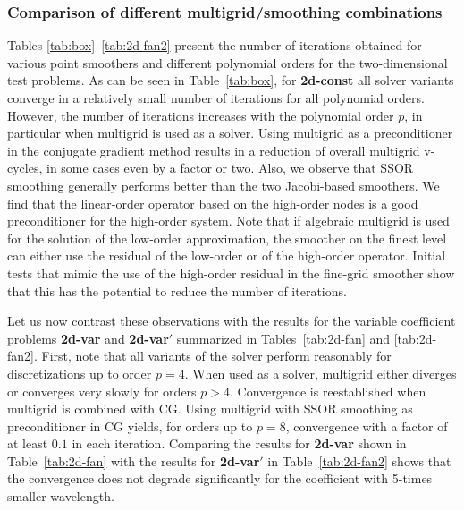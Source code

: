 \documentclass[times]{nlaauth}
\begin{document}
\subsubsection{Comparison of different multigrid/smoothing combinations}\label{subsec:num_point}
Tables \ref{tab:box}--\ref{tab:2d-fan2} present the number of
iterations obtained for various point smoothers and different
polynomial orders for the two-dimensional test problems. As can be
seen in Table~\ref{tab:box}, for {\bf 2d-const}
all solver variants converge in a
relatively small number of iterations for all polynomial
orders. However, the number of
iterations increases with the polynomial order $p$, in particular when
multigrid is used as a solver. Using multigrid as a preconditioner in
the conjugate gradient method results in a reduction of overall
multigrid v-cycles, in some cases even by a factor or two. Also, we
observe that SSOR smoothing generally performs better than the two
Jacobi-based smoothers. We find that the linear-order operator based
on the high-order nodes is a good preconditioner for the high-order
system. Note that if algebraic multigrid is used for the solution of
the low-order approximation, the smoother on the finest level can
either use the residual of the low-order or of the high-order
operator. Initial tests that mimic the use of the high-order residual
in the fine-grid smoother show that this has the potential to reduce the
number of iterations.

%

Let us now contrast these observations with the results for the
variable coefficient problems {\bf 2d-var} and {\bf 2d-var$'$}
summarized in Tables~\ref{tab:2d-fan} and \ref{tab:2d-fan2}. First,
note that all variants of the solver perform reasonably for
discretizations up to order $p=4$. When used as a solver, multigrid
either diverges or converges very slowly for orders $p>4$. Convergence
is reestablished when multigrid is combined with CG. Using multigrid
with SSOR smoothing as preconditioner in CG yields, for orders up to
$p=8$, convergence with a factor of at least $0.1$ in each iteration.
Comparing the results for {\bf 2d-var} shown in Table~\ref{tab:2d-fan}
with the results for {\bf 2d-var$'$} in Table~\ref{tab:2d-fan2} shows
that the convergence does not degrade significantly for the
coefficient with 5-times smaller wavelength.
\end{document}
